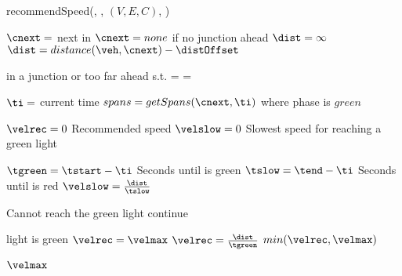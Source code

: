 \begin{algorithm}
\caption{recommendSpeed(\veh, \route, $(V, E, C)$, \distmax)}\label{alg.recommendedSpeed}
\begin{algorithmic}[1]
\State $\cnext= $ next \con in \route\Comment $\cnext=none$ if no junction ahead \label{alg:recSpeed:cnext}
\State $\dist = \infty$
\Else
\State $\dist=distance(\veh,\cnext)-\distOffset$ \label{alg:recSpeed:distance}
\EndIf

\State \Comment \veh in a junction or \cnext too far ahead\label{alg:recSpeed:injunction}
\State\Return \espeed s.t. \eend=\vehposstart
\Else
\State \velmax = \vehposspeed
\EndIf

\State $\ti=$ current time
\State $spans = getSpans(\cnext, \ti)$ \Comment where phase is $green$ \label{alg:recSpeed:getSpan}

\State $\velrec = 0$ \Comment Recommended speed \label{alg:recSpeed:velrec}
\State $\velslow = 0$ \Comment Slowest speed for reaching a green light \label{alg:recSpeed:velslow}

\label{alg:recSpeed:loopSpans}
\State $\tgreen = \tstart - \ti$ \Comment Seconds until \cnextphase is green \label{alg:recSpeed:tg}
\State $\tslow = \tend - \ti$ \Comment Seconds until \cnextphase is red\label{alg:recSpeed:tr}
\State $\velslow = \frac{\dist}{\tslow}$\label{alg:recSpeed:hr}

\If{$\velslow > \velmax$}\Comment Cannot reach the green light\label{alg:recSpeed:continue}
\State continue
\EndIf

\Comment light is green\label{alg:recSpeed:green}
\State $\velrec=\velmax$
\Else
\State $\velrec = \frac{\dist}{\tgreen}$\label{alg:recSpeed:h}
\EndIf
\State\Return $min(\velrec, \velmax)$\label{alg:recSpeed:returnh}
\EndFor\label{alg:recSpeed:loopSpansEnd}

\State\Return $\velmax$\label{alg:recSpeed:returnmax}

\end{algorithmic}
\end{algorithm}